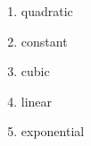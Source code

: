 \documentclass[11pt]{article}
\begin{document}
\begin{enumerate}
    \item quadratic
    \item constant
    \item cubic
    \item linear
    \item exponential
\end{enumerate}
\end{document}
